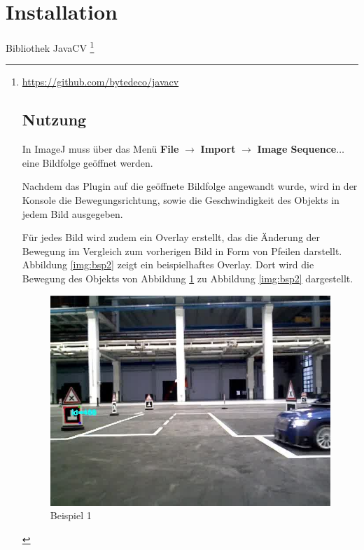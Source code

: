 \section{Installation}
Bibliothek JavaCV \footnote{\url{https://github.com/bytedeco/javacv}


\section{Nutzung}

In ImageJ muss über das Menü \textbf{File} $\rightarrow$ \textbf{Import} $\rightarrow$ \textbf{Image Sequence$\dots$} eine Bildfolge geöffnet werden. 

Nachdem das Plugin auf die geöffnete Bildfolge angewandt wurde, wird in der Konsole die Bewegungsrichtung, sowie die Geschwindigkeit des Objekts in jedem Bild ausgegeben.

Für jedes Bild wird zudem ein Overlay erstellt, das die Änderung der Bewegung im Vergleich zum vorherigen Bild in Form von Pfeilen darstellt. Abbildung \ref{img:bsp2} zeigt ein beispielhaftes Overlay. Dort wird die Bewegung des Objekts von Abbildung \ref{img:bsp1} zu Abbildung \ref{img:bsp2} dargestellt.

\begin{figure}[h]
	\centering
	\includegraphics[scale=0.5]{./Abbildungen/bsp1.jpg}
	\caption{Beispiel 1}
	\label{img:bsp1}
\end{figure}

}
